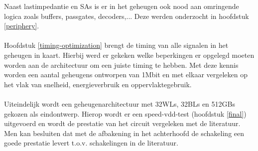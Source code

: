 Naast lastimpedantie en SAs is er in het geheugen ook nood aan omringende logica zoals buffers, passgates, decoders,... Deze werden onderzocht in hoofdstuk \ref{periphery}.\\\\
Hoofdstuk \ref{timing-optimization} brengt de timing van alle signalen in het geheugen in kaart. Hierbij werd er gekeken welke beperkingen er opgelegd moeten worden aan de architectuur om een juiste timing te hebben. Met deze kennis worden een aantal geheugens ontworpen van 1Mbit en met elkaar vergeleken op het vlak van snelheid, energieverbruik en oppervlaktegebruik.\\\\
Uiteindelijk wordt een geheugenarchitectuur met 32WLs, 32BLs en 512GBs gekozen als eindontwerp. Hierop wordt er een speed-vdd-test (hoofdstuk \ref{final}) uitgevoerd en wordt de prestatie van het circuit vergeleken met de literatuur. Men kan besluiten dat met de afbakening in het achterhoofd de schakeling een goede prestatie levert t.o.v. schakelingen in de literatuur.
